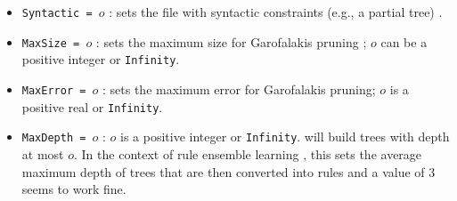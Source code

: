 \begin{itemize}
	\item {\tt Syntactic = $o$} : sets the file with syntactic constraints (e.g., a partial tree) \cite{Struyf06-KDID:proc}.
	\item {\tt MaxSize = $o$} : sets the maximum size for Garofalakis pruning \cite{Garofalakis03:jrnl, Struyf06-KDID:proc}; $o$ can be a positive integer or {\tt Infinity}.
	\item {\tt MaxError = $o$} : sets the maximum error for Garofalakis pruning; $o$ is a positive real or {\tt Infinity}.
	\item {\tt MaxDepth = $o$} : $o$ is a positive integer or {\tt Infinity}. \clus{} will build trees with depth at most $o$. In the context of rule ensemble learning \cite{Aho2009}, this sets the average maximum depth of trees that are then converted into rules and a value of 3 seems to work fine.
\end{itemize}
